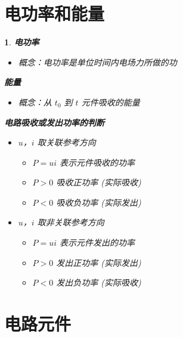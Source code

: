 \documentclass[UTF8]{report}
\theoremstyle{MyLineTheoremStyle} %
\theoremstyle{MyBlockTheoremStyle} %
\theoremstyle{MySubsubsectionStyle} %
\newtheorem{definition}{}
\begin{document}
\section{电功率和能量}

\begin{definition}
    \textbf{电功率}
    \begin{itemize}
        \item 概念：电功率是单位时间内电场力所做的功
    \end{itemize}
    \textbf{能量}
    \begin{itemize}
        \item 概念：从 $t_0$ 到 $t$ 元件吸收的能量
    \end{itemize}

    \textbf{电路吸收或发出功率的判断}
    \begin{itemize}
        \item $u$，$i$ 取关联参考方向
        \begin{itemize}
            \item $P = ui$ 表示元件吸收的功率
            \item $P > 0$ 吸收正功率 (实际吸收)
            \item $P < 0$ 吸收负功率 (实际发出)
        \end{itemize}
        \item $u$，$i$ 取非关联参考方向
        \begin{itemize}
            \item $P = ui$ 表示元件发出的功率
            \item $P > 0$ 发出正功率 (实际发出)
            \item $P < 0$ 发出负功率 (实际吸收)
        \end{itemize}
    \end{itemize}
\end{definition}

\section{电路元件}
\end{document}
